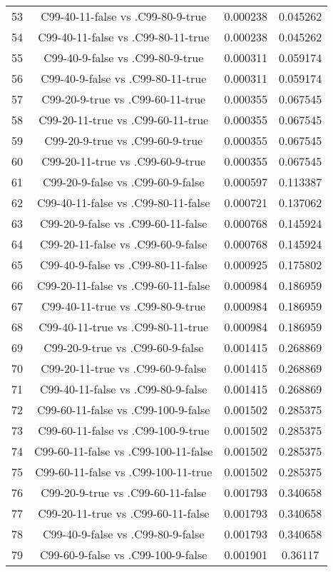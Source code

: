 \documentclass[a4paper,10pt]{article}
\begin{document}
\begin{landscape}
\begin{table}[!htp]
\begin{tabular}{cccc}
53&C99-40-11-false vs .C99-80-9-true&0.000238&0.045262\\
54&C99-40-11-false vs .C99-80-11-true&0.000238&0.045262\\
55&C99-40-9-false vs .C99-80-9-true&0.000311&0.059174\\
56&C99-40-9-false vs .C99-80-11-true&0.000311&0.059174\\
57&C99-20-9-true vs .C99-60-11-true&0.000355&0.067545\\
58&C99-20-11-true vs .C99-60-11-true&0.000355&0.067545\\
59&C99-20-9-true vs .C99-60-9-true&0.000355&0.067545\\
60&C99-20-11-true vs .C99-60-9-true&0.000355&0.067545\\
61&C99-20-9-false vs .C99-60-9-false&0.000597&0.113387\\
62&C99-40-11-false vs .C99-80-11-false&0.000721&0.137062\\
63&C99-20-9-false vs .C99-60-11-false&0.000768&0.145924\\
64&C99-20-11-false vs .C99-60-9-false&0.000768&0.145924\\
65&C99-40-9-false vs .C99-80-11-false&0.000925&0.175802\\
66&C99-20-11-false vs .C99-60-11-false&0.000984&0.186959\\
67&C99-40-11-true vs .C99-80-9-true&0.000984&0.186959\\
68&C99-40-11-true vs .C99-80-11-true&0.000984&0.186959\\
69&C99-20-9-true vs .C99-60-9-false&0.001415&0.268869\\
70&C99-20-11-true vs .C99-60-9-false&0.001415&0.268869\\
71&C99-40-11-false vs .C99-80-9-false&0.001415&0.268869\\
72&C99-60-11-false vs .C99-100-9-false&0.001502&0.285375\\
73&C99-60-11-false vs .C99-100-9-true&0.001502&0.285375\\
74&C99-60-11-false vs .C99-100-11-false&0.001502&0.285375\\
75&C99-60-11-false vs .C99-100-11-true&0.001502&0.285375\\
76&C99-20-9-true vs .C99-60-11-false&0.001793&0.340658\\
77&C99-20-11-true vs .C99-60-11-false&0.001793&0.340658\\
78&C99-40-9-false vs .C99-80-9-false&0.001793&0.340658\\
79&C99-60-9-false vs .C99-100-9-false&0.001901&0.36117\\

\end{tabular}
\end{table}
\end{landscape}
\end{document}
